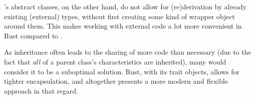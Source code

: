 \cpp's abstract classes,  on the other hand, do not  allow for (re)derivation by
already existing (external)  types, without first creating some  kind of wrapper
object around them. This makes working  with external code a lot more convenient
in Rust compared to \cpp.

As inheritance often  leads to the sharing  of more code than  necessary (due to
the fact that  \textit{all} of a parent class's  characteristics are inherited),
many  would consider  it  to be  a  suboptimal solution.  Rust,  with its  trait
objects, allows for tighter encapsulation, and altogether presents a more modern
and flexible approach in that regard.

